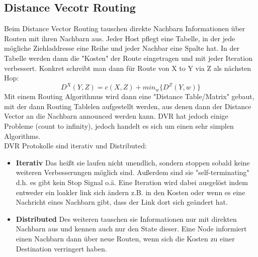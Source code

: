 	\subsection{Distance Vecotr Routing}
		Beim Distance Vector Routing tauschen direkte Nachbarn Informationen über Routen mit ihren Nachbarn aus. Jeder Host pflegt eine Tabelle, in der jede mögliche Ziehladdresse eine Reihe und jeder Nachbar eine Spalte hat. In der Tabelle werden dann die "Kosten" der Route eingetragen und mit jeder Iteration verbessert. Konkret schreibt man dann für Route von X to Y via Z als nächsten Hop:
		$$
			D^X(Y,Z) = c(X,Z) + min_w\{D^Z(Y,w)\}
		$$
		Mit einem Routing Algorithmus wird dann eine "Distance Table/Matrix" gebaut, mit der dann Routing Tablelen aufgestellt werden, aus denen dann der Distance Vector an die Nachbarn announced werden kann. DVR hat jedoch einige Probleme (count to infinity), jedoch handelt es sich um einen sehr simplen Algorithms.\\
		DVR Protokolle sind iterativ und Distributed:
		\begin{itemize}
			\item \textbf{Iterativ} Das heißt sie laufen nicht unendlich, sondern stoppen sobald keine weiteren Verbesserungen möglich sind. Außerdem sind sie "self-terminating" d.h. es gibt kein Stop Signal o.ä. Eine Iteration wird dabei ausgelöst indem entweder ein loakler link sich ändern z.B. in den Kosten oder wenn es eine Nachricht eines Nachbarn gibt, dass der Link dort sich geändert hat. 
			\item \textbf{Distributed} Des weiteren tauschen sie Informationen nur mit direkten Nachbarn aus und kennen auch nur den State dieser. Eine Node informiert einen Nachbarn dann über neue Routen, wenn sich die Kosten zu einer Destination verringert haben.
		\end{itemize}

